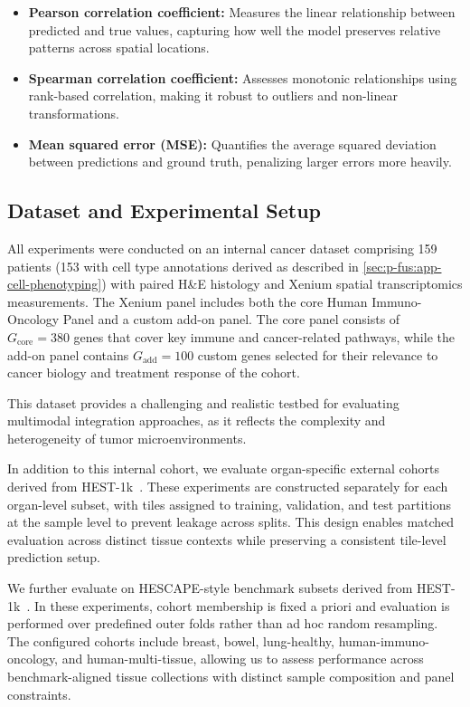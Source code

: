 \begin{itemize}
\item \textbf{Pearson correlation coefficient:} Measures the linear relationship between predicted and true values, capturing how well the model preserves relative patterns across spatial locations.

\item \textbf{Spearman correlation coefficient:} Assesses monotonic relationships using rank-based correlation, making it robust to outliers and non-linear transformations.

\item \textbf{Mean squared error (MSE):} Quantifies the average squared deviation between predictions and ground truth, penalizing larger errors more heavily.
\end{itemize}

\subsection*{Dataset and Experimental Setup}
\label{sec:dataset-and-experimental-setup}

All experiments were conducted on an internal cancer dataset comprising 159 patients (153 with cell type annotations derived as described in \autoref{sec:p-fus:app-cell-phenotyping}) with paired H\&E histology and Xenium spatial transcriptomics measurements. The Xenium panel includes both the core Human Immuno-Oncology Panel and a custom add-on panel. The core panel consists of $G_{\text{core}} = 380$ genes that cover key immune and cancer-related pathways, while the add-on panel contains $G_{\text{add}} = 100$ custom genes selected for their relevance to cancer biology and treatment response of the cohort.

This dataset provides a challenging and realistic testbed for evaluating multimodal integration approaches, as it reflects the complexity and heterogeneity of tumor microenvironments.

In addition to this internal cohort, we evaluate organ-specific external cohorts derived from HEST-1k~\cite{jaume_hest1kdatasetspatial_2024}. These experiments are constructed separately for each organ-level subset, with tiles assigned to training, validation, and test partitions at the sample level to prevent leakage across splits. This design enables matched evaluation across distinct tissue contexts while preserving a consistent tile-level prediction setup.

We further evaluate on HESCAPE-style benchmark subsets derived from HEST-1k~\cite{gindra_largescalebenchmarkcrossmodal_2025}. In these experiments, cohort membership is fixed a priori and evaluation is performed over predefined outer folds rather than ad hoc random resampling. The configured cohorts include breast, bowel, lung-healthy, human-immuno-oncology, and human-multi-tissue, allowing us to assess performance across benchmark-aligned tissue collections with distinct sample composition and panel constraints.

